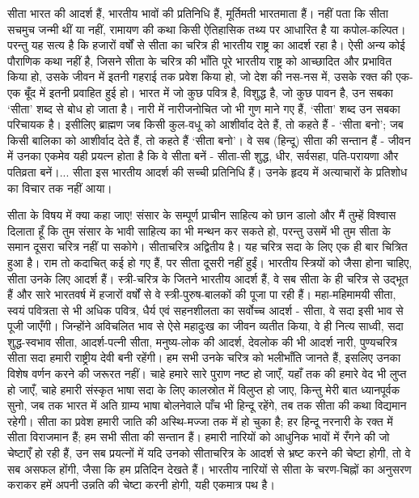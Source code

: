 सीता भारत की आदर्श हैं, भारतीय भावों की प्रतिनिधि हैं, मूर्तिमती भारतमाता हैं। नहीं पता कि सीता सचमुच जन्मी थीं या नहीं, रामायण की कथा किसी ऐतिहासिक तथ्य पर आधारित है या कपोल-कल्पित। परन्तु यह सत्य है कि हजारों वर्षों से सीता का चरित्र ही भारतीय राष्ट्र का आदर्श रहा है। ऐसी अन्य कोई पौराणिक कथा नहीं है, जिसने सीता के चरित्र की भाँति पूरे भारतीय राष्ट्र को आच्छादित और प्रभावित किया हो, उसके जीवन में इतनी गहराई तक प्रवेश किया हो, जो देश की नस-नस में, उसके रक्त की एक-एक बूँद में इतनी प्रवाहित हुई हो। भारत में जो कुछ पवित्र है, विशुद्ध है, जो कुछ पावन है, उन सबका ‘सीता’ शब्द से बोध हो जाता है। नारी में नारीजनोचित जो भी गुण माने गए हैं, ‘सीता’ शब्द उन सबका परिचायक है। इसीलिए ब्राह्मण जब किसी कुल-वधू को आशीर्वाद देते हैं, तो कहते हैं - ‘सीता बनो’; जब किसी बालिका को आशीर्वाद देते हैं, तो कहते हैं ‘सीता बनो’। वे सब (हिन्दू) सीता की सन्तान हैं - जीवन में उनका एकमेव यही प्रयत्न होता है कि वे सीता बनें - सीता-सी शुद्ध, धीर, सर्वसहा, पति-परायणा और पतिव्रता बनें।... सीता इस भारतीय आदर्श की सच्ची प्रतिनिधि हैं। उनके हृदय में अत्याचारों के प्रतिशोध का विचार तक नहीं आया। 

सीता के विषय में क्या कहा जाए! संसार के सम्पूर्ण प्राचीन साहित्य को छान डालो और मैं तुम्हें विश्वास दिलाता हूँ कि तुम संसार के भावी साहित्य का भी मन्थन कर सकते हो, परन्तु उसमें भी तुम सीता के समान दूसरा चरित्र नहीं पा सकोगे। सीताचरित्र अद्वितीय है। यह चरित्र सदा के लिए एक ही बार चित्रित हुआ है। राम तो कदाचित् कई हो गए हैं, पर सीता दूसरी नहीं हुईं। भारतीय स्त्रियों को जैसा होना चाहिए, सीता उनके लिए आदर्श हैं। स्त्री-चरित्र के जितने भारतीय आदर्श हैं, वे सब सीता के ही चरित्र से उद्भूत हैं और सारे भारतवर्ष में हजारों वर्षों से वे स्त्री-पुरुष-बालकों की पूजा पा रही हैं। महा-महिमामयी सीता, स्वयं पवित्रता से भी अधिक पवित्र, धैर्य एवं सहनशीलता का सर्वोच्च आदर्श - सीता, वे सदा इसी भाव से पूजी जाएँगी। जिन्होंने अविचलित भाव से ऐसे महादुःख का जीवन व्यतीत किया, वे ही नित्य साध्वी, सदा शुद्ध-स्वभाव सीता, आदर्श-पत्नी सीता, मनुष्य-लोक की आदर्श, देवलोक की भी आदर्श नारी, पुण्यचरित्र सीता सदा हमारी राष्ट्रीय देवी बनी रहेंगी। हम सभी उनके चरित्र को भलीभाँति जानते हैं, इसलिए उनका विशेष वर्णन करने की जरूरत नहीं। चाहे हमारे सारे पुराण नष्ट हो जाएँ, यहाँ तक की हमारे वेद भी लुप्त हो जाएँ, चाहे हमारी संस्कृत भाषा सदा के लिए कालस्रोत में विलुप्त हो जाए, किन्तु मेरी बात ध्यानपूर्वक सुनो, जब तक भारत में अति ग्राम्य भाषा बोलनेवाले पाँच भी हिन्दू रहेंगे, तब तक सीता की कथा विद्यमान रहेगी। सीता का प्रवेश हमारी जाति की अस्थि-मज्जा तक में हो चुका है; हर हिन्दू नरनारी के रक्त में सीता विराजमान हैं; हम सभी सीता की सन्तान हैं। हमारी नारियों को आधुनिक भावों में रँगने की जो चेष्टाएँ हो रही हैं, उन सब प्रयत्नों में यदि उनको सीताचरित्र के आदर्श से भ्रष्ट करने की चेष्टा होगी, तो वे सब असफल होंगी, जैसा कि हम प्रतिदिन देखते हैं। भारतीय नारियों से सीता के चरण-चिह्नों का अनुसरण कराकर हमें अपनी उन्नति की चेष्टा करनी होगी, यही एकमात्र पथ है। 

